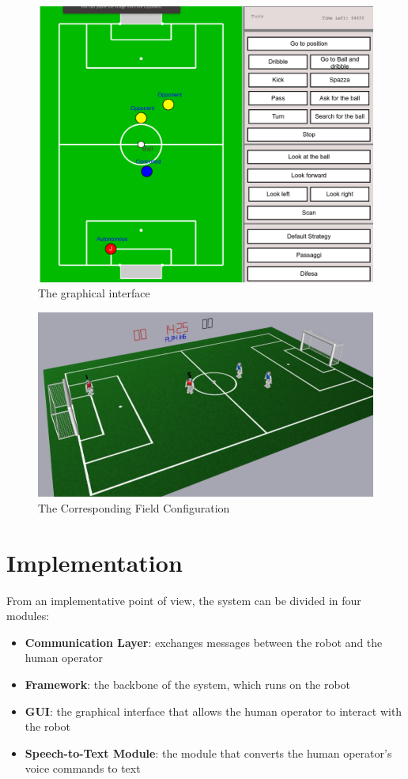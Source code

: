 \documentclass[a4paper, onecolumn, 12pt]{article}
\begin{document}
\begin{figure}[H]
    \centering
    \includegraphics[width=0.9\linewidth]{assets/interface.png}
    \caption{The graphical interface}
    \label{fig:interface}
\end{figure}

\begin{figure}[H]
    \centering
    \includegraphics[width=0.9\linewidth]{assets/simrobot.png}
    \caption{The Corresponding Field Configuration}
    \label{fig:nao}
\end{figure}

\newpage
\section{Implementation}
\label{sec:impl}

From an implementative point of view, the system can be divided in four modules: 
\begin{itemize}
    \item \textbf{Communication Layer}: exchanges messages between the robot and the human operator
    \item \textbf{Framework}: the backbone of the system, which runs on the robot
    \item \textbf{GUI}: the graphical interface that allows the human operator to interact with the robot
    \item \textbf{Speech-to-Text Module}: the module that converts the human operator's voice commands to text
\end{itemize}
\end{document}
